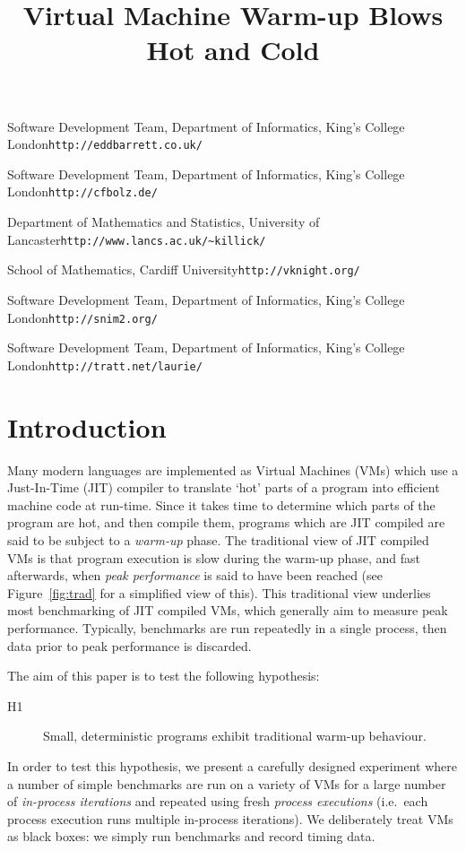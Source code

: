 \documentclass[preprint]{sigplanconf}
\newcommand{\hypone}{H1\xspace}
\begin{document}
\title{Virtual Machine Warm-up Blows Hot and Cold}

{Software Development Team, Department of Informatics, King's College London}{\texttt{http://eddbarrett.co.uk/}}

{Software Development Team, Department of Informatics, King's College London}{\texttt{http://cfbolz.de/}}

{Department of Mathematics and Statistics, University of Lancaster}{\texttt{http://www.lancs.ac.uk/\~{}killick/}}

{School of Mathematics, Cardiff University}{\texttt{http://vknight.org/}}

{Software Development Team, Department of Informatics, King's College London}{\texttt{http://snim2.org/}}

{Software Development Team, Department of Informatics, King's College London}{\texttt{http://tratt.net/laurie/}}


\maketitle

\section{Introduction}
\label{sec:intro}

Many modern languages are implemented as Virtual Machines (VMs) which use a
Just-In-Time (JIT) compiler to translate `hot' parts of a program into efficient
machine code at run-time. Since it takes time to determine which parts of the
program are hot, and then compile them, programs which are JIT compiled are
said to be subject to a \emph{warm-up} phase. The traditional view of
JIT compiled VMs is that program execution is slow during the warm-up phase, and
fast afterwards, when \emph{peak performance} is said to have been reached
(see Figure~\ref{fig:trad} for a simplified view of this).
This traditional view underlies most benchmarking of JIT compiled VMs, which
generally aim to measure peak performance.
Typically, benchmarks are run repeatedly in a single process, then data prior
to peak performance is discarded.

The aim of this paper is to test the following hypothesis:
\begin{description}
  \item[\hypone] Small, deterministic programs exhibit traditional warm-up behaviour.
\end{description}
In order to test this hypothesis, we present a carefully designed
experiment where a number of simple benchmarks are run on a variety of
VMs for a large number of \emph{in-process iterations} and repeated using fresh
\emph{process executions} (i.e.~each process execution runs multiple in-process
iterations). We deliberately treat VMs as black boxes: we simply run benchmarks
and record timing data.
\end{document}
